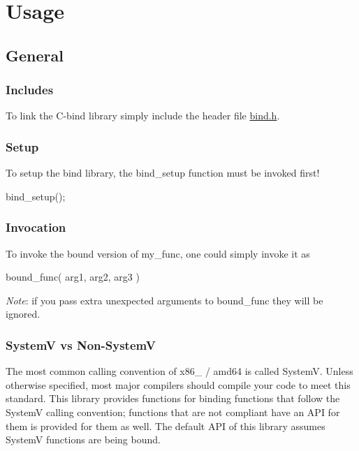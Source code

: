 \section*{Usage}

\subsection*{General}

\subsubsection*{Includes}

To link the {\ttfamily C-\/bind} library simply include the header file {\ttfamily \hyperlink{bind_8h}{bind.\+h}}.

\subsubsection*{Setup}

To setup the bind library, the {\ttfamily bind\+\_\+setup} function must be invoked first! 
\begin{DoxyCode}
bind\_setup();
\end{DoxyCode}


\subsubsection*{Invocation}

To invoke the bound version of {\ttfamily my\+\_\+func}, one could simply invoke it as 
\begin{DoxyCode}
bound\_func( arg1, arg2, arg3 )
\end{DoxyCode}
 {\itshape Note}\+: if you pass extra unexpected arguments to {\ttfamily bound\+\_\+func} they will be ignored.

\subsubsection*{SystemV vs Non-\/\+SystemV}

The most common calling convention of {\ttfamily x86\+\_} / {\ttfamily amd64} is called SystemV. Unless otherwise specified, most major compilers should compile your code to meet this standard. This library provides functions for binding functions that follow the SystemV calling convention; functions that are not compliant have an A\+PI for them is provided for them as well. The default A\+PI of this library assumes SystemV functions are being bound.

